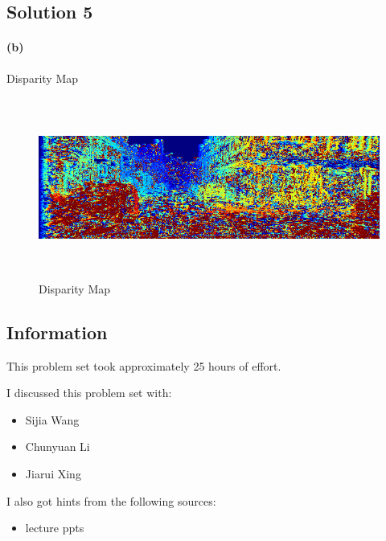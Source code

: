 \documentclass{article}
\newcommand{\info}{\clearpage \subsection*{Information}}
\newcommand{\solution}[1]{\clearpage \subsection*{Solution #1}}  %
\newcommand{\spart}[1]{\paragraph{(#1)}}
\begin{document}
\solution{5}
\spart{b} Disparity Map
\begin{figure}[h!]
  \centering
	\includegraphics[height=16em]{code/outputs/prob5.png}
	  \caption{Disparity Map}
\end{figure}


\info

This problem set took approximately 25 hours of effort.


I discussed this problem set with:
\begin{itemize}
\item Sijia Wang
\item Chunyuan Li
\item Jiarui Xing
\end{itemize}


I also got hints from the following sources:
\begin{itemize}
\item lecture ppts
\end{itemize}
\end{document}
